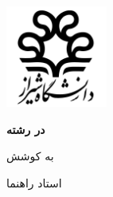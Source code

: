 \begin{titlepage}
    \centering
    \includegraphics[width=0.25\textwidth]{assets/shiraz_university_logo.pdf}

    \vspace{\baselineskip}
    \textbf{\persiandepartment}

    \textbf{{\persiantype} {\persiandegree} در رشته \\ {\persianfield}}

    \vspace{3\baselineskip}
    \textbf{\large \persiantitle}

    \vspace{3\baselineskip}
    به کوشش \\
    \textbf{\persianname}

    \vspace{2\baselineskip}
    استاد راهنما \\
    \textbf{\persiansupervisor}

    \vspace{\baselineskip}
    \textbf{\persiandate}
\end{titlepage}
